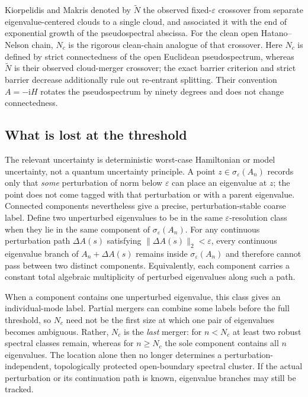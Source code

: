\documentclass[review,hidelinks,onefignum,onetabnum]{siamart251216}
\newcommand{\ii}{\mathrm i}
\begin{document}
Kiorpelidis and Makris \cite{KiorpelidisMakris2025} denoted by
\(\widetilde N\) the observed fixed-\(\varepsilon\) crossover from separate
eigenvalue-centered clouds to a single cloud, and associated it with the end
of exponential growth of the pseudospectral abscissa.  For the clean open
Hatano--Nelson chain, \(N_c\) is the rigorous clean-chain analogue of that
crossover.  Here \(N_c\) is defined by strict connectedness of the open
Euclidean pseudospectrum, whereas \(\widetilde N\) is their observed
cloud-merger crossover; the exact barrier criterion and strict barrier
decrease additionally rule out re-entrant splitting.  Their convention
\(A=-\ii H\) rotates
the pseudospectrum by ninety degrees and does not change connectedness.

\subsection{What is lost at the threshold}

The relevant uncertainty is deterministic worst-case Hamiltonian or model
uncertainty, not a quantum uncertainty principle.  A point
\(z\in\sigma_\varepsilon(A_n)\) records only that \emph{some} perturbation of
norm below \(\varepsilon\) can place an eigenvalue at \(z\); the point does
not come tagged with that perturbation or with a parent eigenvalue.
Connected components nevertheless give a precise, perturbation-stable
coarse label.  Define two unperturbed eigenvalues to be in the same
\(\varepsilon\)-resolution class when they lie in the same component of
\(\sigma_\varepsilon(A_n)\).  For any continuous perturbation path
\(\Delta A(s)\) satisfying \(\lVert\Delta A(s)\rVert_2<\varepsilon\), every
continuous eigenvalue branch of \(A_n+\Delta A(s)\) remains inside
\(\sigma_\varepsilon(A_n)\) and therefore cannot pass between two distinct
components.  Equivalently, each component carries a constant total algebraic
multiplicity of perturbed eigenvalues along such a path.

When a component contains one unperturbed eigenvalue, this class gives an
individual-mode label.  Partial mergers can combine some labels before the
full threshold, so \(N_c\) need not be the first size at which one pair of
eigenvalues becomes ambiguous.  Rather, \(N_c\) is the \emph{last} merger:
for \(n<N_c\) at least two robust spectral classes remain, whereas for
\(n\geq N_c\) the sole component contains all \(n\) eigenvalues.  The
location alone then no longer determines a perturbation-independent,
topologically protected open-boundary spectral cluster.  If the actual
perturbation or its continuation path is known, eigenvalue branches may
still be tracked.
\end{document}

